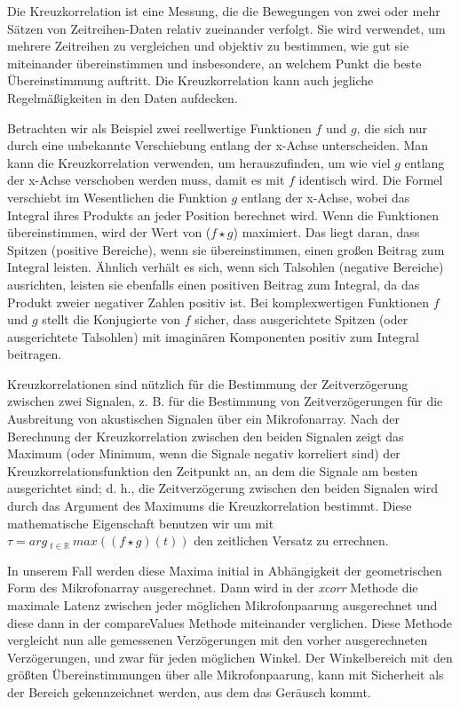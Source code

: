 Die Kreuzkorrelation ist eine Messung, die die Bewegungen von zwei oder mehr Sätzen von Zeitreihen-Daten relativ zueinander verfolgt. Sie wird verwendet, um mehrere Zeitreihen zu vergleichen und objektiv zu bestimmen, wie gut sie miteinander übereinstimmen und insbesondere, an welchem Punkt die beste Übereinstimmung auftritt. Die Kreuzkorrelation kann auch jegliche Regelmäßigkeiten in den Daten aufdecken.

Betrachten wir als Beispiel zwei reellwertige Funktionen $ f $ und $ g $, die sich nur durch eine unbekannte Verschiebung entlang der x-Achse unterscheiden. Man kann die Kreuzkorrelation verwenden, um herauszufinden, um wie viel $ g $ entlang der x-Achse verschoben werden muss, damit es mit $ f $ identisch wird. Die Formel verschiebt im Wesentlichen die Funktion $ g $ entlang der x-Achse, wobei das Integral ihres Produkts an jeder Position berechnet wird. Wenn die Funktionen übereinstimmen, wird der Wert von ($ f \star g $) maximiert. Das liegt daran, dass Spitzen (positive Bereiche), wenn sie übereinstimmen, einen großen Beitrag zum Integral leisten. Ähnlich verhält es sich, wenn sich Talsohlen (negative Bereiche) ausrichten, leisten sie ebenfalls einen positiven Beitrag zum Integral, da das Produkt zweier negativer Zahlen positiv ist. Bei komplexwertigen Funktionen $ f $ und $ g $ stellt die Konjugierte von $ f $ sicher, dass ausgerichtete Spitzen (oder ausgerichtete Talsohlen) mit imaginären Komponenten positiv zum Integral beitragen.

Kreuzkorrelationen sind nützlich für die Bestimmung der Zeitverzögerung zwischen zwei Signalen, z. B. für die Bestimmung von Zeitverzögerungen für die Ausbreitung von akustischen Signalen über ein Mikrofonarray. Nach der Berechnung der Kreuzkorrelation zwischen den beiden Signalen zeigt das Maximum (oder Minimum, wenn die Signale negativ korreliert sind) der Kreuzkorrelationsfunktion den Zeitpunkt an, an dem die Signale am besten ausgerichtet sind; d. h., die Zeitverzögerung zwischen den beiden Signalen wird durch das Argument des Maximums die Kreuzkorrelation bestimmt. Diese mathematische Eigenschaft benutzen wir um mit
$ \tau= arg\ _{t \in \mathbb{R}}\ max\left(( f \star g)(t)\right) $ den zeitlichen Versatz zu errechnen.

In unserem Fall werden diese Maxima initial in Abhängigkeit der geometrischen Form des Mikrofonarray ausgerechnet. Dann wird in der \textit{xcorr} Methode die maximale Latenz zwischen jeder möglichen Mikrofonpaarung ausgerechnet und diese dann in der compareValues Methode miteinander verglichen. Diese Methode vergleicht nun alle gemessenen Verzögerungen mit den vorher ausgerechneten Verzögerungen, und zwar für jeden möglichen Winkel. Der Winkelbereich mit den größten Übereinstimmungen über alle Mikrofonpaarung, kann mit Sicherheit als der Bereich gekennzeichnet werden, aus dem das Geräusch kommt.

